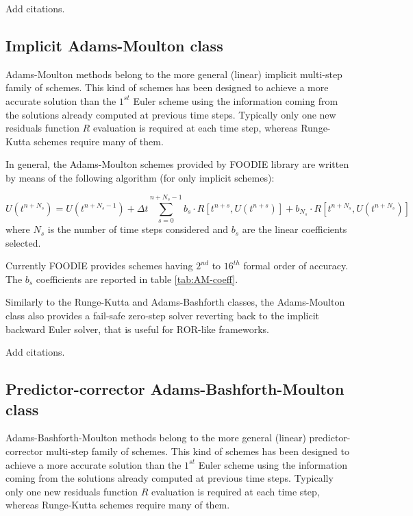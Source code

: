 {\color{red} Add citations.}

\subsection{Implicit Adams-Moulton class}

Adams-Moulton methods belong to the more general (linear) implicit multi-step family of schemes. This kind of schemes has been designed to achieve a more accurate solution than the $1^{st}$ Euler scheme using the information coming from the solutions already computed at previous time steps. Typically only one new residuals function $R$ evaluation is required at each time step, whereas Runge-Kutta schemes require many of them.

In general, the Adams-Moulton schemes provided by FOODIE library are written by means of the following algorithm (for only implicit schemes):

\begin{equation}
  U\left(t^{n+N_s}\right) = U\left(t^{n+N_s-1}\right) +\Delta t \sum_{s=0}^{n+N_s-1}{ b_s \cdot R\left[t^{n+s}, U\left(t^{n+s}\right)\right]} + b_{N_s}\cdot R\left[t^{n+N_s}, U\left(t^{n+N_s}\right)\right]
\label{eq:AM}
\end{equation}
where $N_s$ is the number of time steps considered and $b_s$ are the linear coefficients selected.

Currently FOODIE provides schemes having $2^{nd}$ to $16^{th}$ formal order of accuracy. The $b_s$ coefficients are reported in table \ref{tab:AM-coeff}.

Similarly to the Runge-Kutta and Adams-Bashforth classes, the Adams-Moulton class also provides a fail-safe zero-step solver reverting back to the implicit backward Euler solver, that is useful for ROR-like frameworks.

{\color{red} Add citations.}

\subsection{Predictor-corrector Adams-Bashforth-Moulton class}

Adams-Bashforth-Moulton methods belong to the more general (linear) predictor-corrector multi-step family of schemes. This kind of schemes has been designed to achieve a more accurate solution than the $1^{st}$ Euler scheme using the information coming from the solutions already computed at previous time steps. Typically only one new residuals function $R$ evaluation is required at each time step, whereas Runge-Kutta schemes require many of them.

